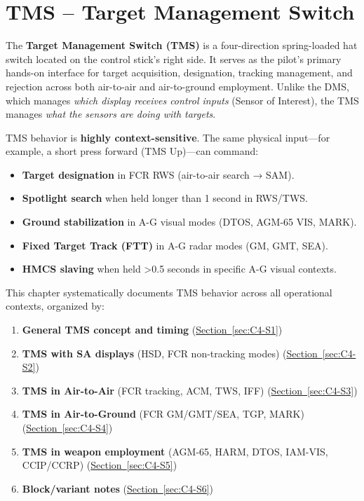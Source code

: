 \documentclass[11pt, a4paper, twoside]{report}
\newcommand{\secref}[1]{\hyperref[#1]{Section~\ref*{#1}}}
\begin{document}
\chapter{TMS -- Target Management Switch}
\label{chap:C4}


The \textbf{Target Management Switch (TMS)} is a four-direction spring-loaded hat switch located on the control stick's right side. It serves as the pilot's primary hands-on interface for target acquisition, designation, tracking management, and rejection across both air-to-air and air-to-ground employment. Unlike the DMS, which manages \textit{which display receives control inputs} (Sensor of Interest), the TMS manages \textit{what the sensors are doing with targets}.

TMS behavior is \textbf{highly context-sensitive}. The same physical input---for example, a short press forward (TMS Up)---can command:
\begin{itemize}
    \item \textbf{Target designation} in FCR RWS (air-to-air search → SAM).
    \item \textbf{Spotlight search} when held longer than 1 second in RWS/TWS.
    \item \textbf{Ground stabilization} in A-G visual modes (DTOS, AGM-65 VIS, MARK).
    \item \textbf{Fixed Target Track (FTT)} in A-G radar modes (GM, GMT, SEA).
    \item \textbf{HMCS slaving} when held >0.5 seconds in specific A-G visual contexts.
\end{itemize}

This chapter systematically documents TMS behavior across all operational contexts, organized by:
\begin{enumerate}
    \item \textbf{General TMS concept and timing} (\secref{sec:C4-S1})
    \item \textbf{TMS with SA displays} (HSD, FCR non-tracking modes) (\secref{sec:C4-S2})
    \item \textbf{TMS in Air-to-Air} (FCR tracking, ACM, TWS, IFF) (\secref{sec:C4-S3})
    \item \textbf{TMS in Air-to-Ground} (FCR GM/GMT/SEA, TGP, MARK) (\secref{sec:C4-S4})
    \item \textbf{TMS in weapon employment} (AGM-65, HARM, DTOS, IAM-VIS, CCIP/CCRP) (\secref{sec:C4-S5})
    \item \textbf{Block/variant notes} (\secref{sec:C4-S6})
\end{enumerate}
\end{document}
